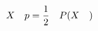 \documentclass[preview]{standalone}
\begin{document}
\begin{align*}
\special{dvisvgm:raw <g id='unique000'>}X \quad p=\dfrac{1}{2} \quad P(X \quad )\special{dvisvgm:raw </g>}
\end{align*}
\end{document}
